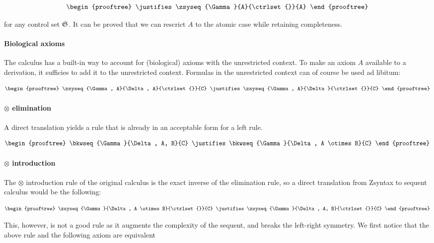 \[
  \begin{prooftree}
    \justifies
    \zsyseq{\Gamma}{A}{\ctrlset{}}{A}
  \end{prooftree}
\]

for any control set $\mathfrak{S}_{}$. It can be proved that we can rescrict $A$ to
the atomic case while retaining completeness.

\paragraph{Biological axioms}

The calculus has a built-in way to account for (biological) axioms with the
unrestricted context. To make an axiom $A$ available to a derivation, it
sufficies to add it to the unrestricted context. Formulas in the unrestricted
context can of course be used ad libitum:

\[
  \begin{prooftree}
    \zsyseq{\Gamma, A}{\Delta, A}{\ctrlset{}}{C}
    \justifies
    \zsyseq{\Gamma, A}{\Delta}{\ctrlset{}}{C}
  \end{prooftree}
\]

\paragraph{$\otimes$ elimination}

A direct translation yields a rule that is already in an acceptable form for a
left rule.

\[
  \begin{prooftree}
    \bkwseq{\Gamma}{\Delta, A, B}{C}
    \justifies
    \bkwseq{\Gamma}{\Delta, A \otimes B}{C}
  \end{prooftree}
\]

\paragraph{$\otimes$ introduction}

The $\otimes$ introduction rule of the original calculus is the exact inverse of
the elimination rule, so a direct translation from Zsyntax to sequent calculus
would be the following:

\[
  \begin{prooftree}
    \zsyseq{\Gamma}{\Delta, A \otimes B}{\ctrlset{}}{C}
    \justifies
    \zsyseq{\Gamma}{\Delta, A, B}{\ctrlset{}}{C}
  \end{prooftree}
\]

This, however, is not a good rule as it augments the complexity of the sequent,
and breaks the left-right symmetry. We first notice that the above rule and the
following axiom are equivalent

